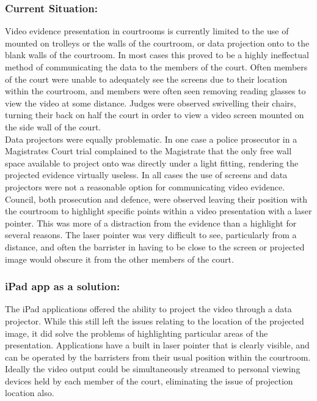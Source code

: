 \documentclass{article}
\begin{document}
\subsubsection{Current Situation:}
Video evidence presentation in courtrooms is currently limited to the use of  mounted on trolleys or the walls of the courtroom, or data projection onto to the blank walls of the courtroom. In most cases this proved to be a highly ineffectual method of communicating the data to the members of the court. Often members of the court were unable to adequately see the screens due to their location within the courtroom, and members were often  seen removing reading glasses to view the video at some distance. Judges were observed swivelling their chairs, turning their back on half the court in order to view a video screen mounted on the side wall of the court.\\
Data projectors were equally problematic. In one case a police prosecutor in a Magistrates Court trial complained to the Magistrate that the only free wall space available to project onto was directly under a light fitting, rendering the projected evidence virtually useless.
In all cases the use of screens and data projectors were not a reasonable option for communicating video evidence. \\
Council, both prosecution and defence, were observed leaving their position with the courtroom to highlight specific points within a video presentation with a laser pointer. This was more of a distraction from the evidence than a highlight for several reasons. The laser pointer was very difficult to see, particularly from a distance, and often the barrister in having to be close to the screen or projected image would obscure it from the other members of the court.\\
\subsubsection{iPad app as a solution:}
The iPad applications offered the ability to project the video through a data projector. While this still left the issues relating to the location of the projected image, it did solve the problems of highlighting particular areas of the presentation. Applications have a built in laser pointer that is clearly visible, and can be operated by the barristers from their usual position within the courtroom. Ideally the video output could be simultaneously streamed to personal viewing devices held by each member of the court, eliminating the issue of projection location also.\\
\end{document}
